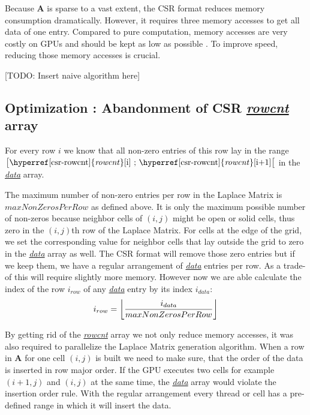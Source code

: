 Because \textbf{A} is sparse to a vast extent, the CSR format reduces memory consumption dramatically. However, it requires three memory accesses to get all data of one entry. Compared to pure computation, memory accesses are very costly on GPUs and should be kept as low as possible \parencite{fang2018benchmarking}\parencite{fujii2013data}. To improve speed, reducing those memory accesses is crucial.

[TODO: Insert naive algorithm here]
\newpage


\subsection{Optimization : Abandonment of CSR \hyperref[csr-rowcnt]{\textit{rowcnt}} array}\label{optimization1}
For every row $i$ we know that all non-zero entries of this row lay in the range $\big[\text{\hyperref[csr-rowcnt]{\textit{rowcnt}}[i] ; \hyperref[csr-rowcnt]{\textit{rowcnt}}[i+1]}\big[$ in the \hyperref[csr-data]{\textit{data}} array. 
\par The maximum number of non-zero entries per row in the Laplace Matrix is $maxNonZerosPerRow$ as defined above. It is only the maximum possible number of non-zeros because neighbor cells of $(i,j)$ might be open or solid cells, thus zero in the $(i,j)$th row of the Laplace Matrix. For cells at the edge of the grid, we set the corresponding value for neighbor cells that lay outside the grid to zero in the \hyperref[csr-data]{\textit{data}} array as well. The CSR format will remove those zero entries but if we keep them, we have a regular arrangement of \hyperref[csr-data]{\textit{data}} entries per row. As a trade-of this will require slightly more memory. However now we are able calculate the index of the row $i_{row}$ of any \hyperref[csr-data]{\textit{data}} entry by its index $i_{data}$:
\begin{equation} \label{row-index-by-data-index}
	i_{row} = \floor*{\frac{i_{data}}{maxNonZerosPerRow}}
\end{equation}
\par By getting rid of the \hyperref[csr-rowcnt]{\textit{rowcnt}} array we not only reduce memory accesses, it was also required to parallelize the Laplace Matrix generation algorithm. When a row in \textbf{A} for one cell $(i,j)$ is built we need to make sure, that the order of the data is inserted in row major order. If the GPU executes two cells for example $(i+1,j)$ and $(i,j)$ at the same time, the \hyperref[csr-data]{\textit{data}} array would violate the insertion order rule. With the regular arrangement every thread or cell has a pre-defined range in which it will insert the data.
\newpage

